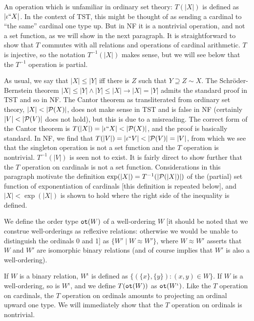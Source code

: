 \documentclass[12pt]{article}
\begin{document}
An operation which is unfamiliar in ordinary set theory:  $T(|X|)$ is defined as $|\iota``X|$.  In the context of TST, this might be thought of as sending a cardinal to ``the same'' cardinal one type up.   But in NF it is a nontrivial operation, and not a set function, as we will show in the next paragraph.  It is straightforward to show that $T$ commutes with all relations and operations of cardinal arithmetic.  $T$ is injective, so the notation
$T^{-1}(|X|)$ makes sense, but we will see below that the $T^{-1}$ operation is partial.

As usual, we say that $|X| \leq |Y|$ iff there is $Z$ such that $Y \supseteq Z \sim X$.  The Schr\"oder-Bernstein theorem $|X| \leq |Y| \wedge |Y| \leq |X| \rightarrow |X| = |Y|$ admits the standard proof
in TST and so in NF.  The Cantor theorem as transliterated from ordinary set theory, $|X| < |{\cal P}(X)|$, does not make sense in TST and is false in NF (certainly $|V| < |{\cal P}(V)|$ does not hold), but this is due to a misreading.  The correct form of the Cantor theorem is $T(|X|) = |\iota``X| < |{\cal P}(X)|$, and the proof is basically standard.  In NF, we find that $T(|V|) = |\iota``V| < |{\cal P}(V)| = |V|$, from which we see that the singleton operation is not a set function and the $T$ operation is nontrivial.  $T^{-1}(|V|)$ is seen not to exist.  It is fairly direct to show further that the $T$ operation on cardinals is not a set function.  Considerations in this paragraph
motivate the definition $\exp(|X|) = T^{-1}(|{\cal P}(|X|)|)$ of the (partial) set function of exponentiation of cardinals [this definition is repeated below], and $|X| < \exp(|X|)$ is shown to hold where the right side of the inequality is defined.

We define the order type ${\tt ot}(W)$ of a well-ordering $W$ [it should be noted that we construe well-orderings as reflexive relations:  otherwise we would be unable to distinguish the ordinals 0 and 1] as $\{W'\mid W \approx W'\}$, where $W \approx W'$ asserts that $W$ and $W'$ are isomorphic binary relations (and of course implies that $W'$ is also a well-ordering).

If $W$ is a binary relation, $W^\iota$ is defined as $\{(\{x\},\{y\}):(x,y)\in W\}$.  If $W$ is a well-ordering, so is $W^\iota$, and we define $T({\tt ot}(W))$ as ${\tt ot}(W^\iota)$.  Like the $T$ operation on cardinals, the $T$ operation on ordinals amounts to projecting an ordinal upward one type.  We will immediately show that the $T$ operation on ordinals is nontrivial.
\end{document}
